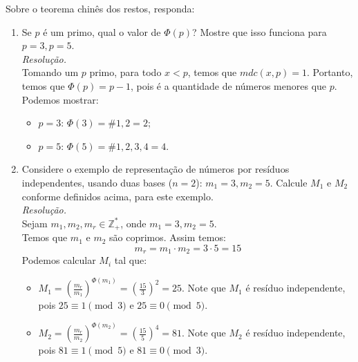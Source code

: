 Sobre o teorema chinês dos restos, responda:
\begin{enumerate}
	\item Se $p$ é um primo, qual o valor de $\Phi(p)$? Mostre que isso funciona para $p = 3, p = 5$. \\
	\emph{Resolução.} \\
	Tomando um $p$ primo, para todo $x < p$, temos que $mdc(x, p) = 1$. Portanto, temos que $\Phi(p) = p - 1$, pois é a quantidade de números menores que $p$. Podemos mostrar:
	\begin{itemize}
		\item $p = 3$: $\Phi(3) = \#{1, 2} = 2$;
		\item $p = 5$: $\Phi(5) = \#{1, 2, 3, 4} = 4$.
	\end{itemize}

	\item Considere o exemplo de representação de números por resíduos independentes, usando duas bases ($n = 2$): $m_1 = 3, m_2 = 5$. Calcule $M_1$ e $M_2$ conforme definidos acima, para este exemplo. \\
	\emph{Resolução.} \\
	Sejam $m_1, m_2, m_r \in \mathbb{Z}_+^*$, onde $m_1 = 3, m_2 = 5$. \\
	Temos que $m_1$ e $m_2$ são coprimos. Assim temos:
	\begin{displaymath}
		m_r = m_1 \cdot m_2 = 3 \cdot 5 = 15
	\end{displaymath}
	Podemos calcular $M_i$ tal que:
	\begin{itemize}
		\item $M_1 = (\frac{m_r}{m_1})^{\Phi(m_1)} = (\frac{15}{3})^2 = 25$. Note que $M_1$ é resíduo independente, pois $25 \equiv 1 \pmod{3}$ e $25 \equiv 0 \pmod{5}$.
		\item $M_2 = (\frac{m_r}{m_2})^{\Phi(m_2)} = (\frac{15}{5})^4 = 81$. Note que $M_2$ é resíduo independente, pois $81 \equiv 1 \pmod{5}$ e $81 \equiv 0 \pmod{3}$.
	\end{itemize}
\end{enumerate}

